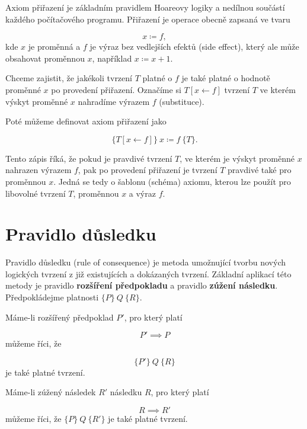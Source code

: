 Axiom přiřazení je základním pravidlem Hoareovy logiky a nedílnou součástí každého počítačového programu.
Přiřazení je operace obecně zapsaná ve tvaru

\begin{equation*}
    x \coloneqq f,
\end{equation*}
kde $x$ je proměnná a $f$ je výraz bez vedlejších efektů (side effect),
který ale může obsahovat proměnnou $x$, například $x \coloneqq x + 1$.

Chceme zajistit, že jakékoli tvrzení $T$ platné o $f$
je také platné o hodnotě proměnné $x$ po provedení přiřazení.
Označíme si $T[x \leftarrow f]$ tvrzení $T$ ve kterém výskyt proměnné $x$ nahradíme výrazem $f$ (substituce).

Poté můžeme definovat axiom přiřazení jako

\begin{equation*}
    \{ T[x \leftarrow f] \} \  x \coloneqq f \  \{ T \}.
\end{equation*}

Tento zápis říká, že pokud je pravdivé tvrzení $T$, ve kterém
je výskyt proměnné $x$ nahrazen výrazem $f$, pak po provedení přiřazení
je tvrzení $T$ pravdivé také pro proměnnou $x$.
Jedná se tedy o šablonu (schéma) axiomu,
kterou lze použít pro libovolné tvrzení $T$, proměnnou $x$ a výraz $f$.

\section{Pravidlo důsledku}
\label{sec:hoare-pravidlo-dusledku}

Pravidlo důsledku (rule of consequence) je metoda umožnující
tvorbu nových logických tvrzení z již existujících a dokázaných tvrzení.
Základní aplikací této metody je pravidlo \textbf{rozšíření předpokladu}
a pravidlo \textbf{zúžení následku}.
Předpokládejme platnosti $\{ P \} \  Q \  \{ R \}$.

Máme-li rozšířený předpoklad $P'$, pro který platí

\begin{equation*}
    P' \implies P
\end{equation*}
můžeme říci, že

\begin{equation*}
    \{ P' \} \  Q \  \{ R \}
\end{equation*}
je také platné tvrzení.

Máme-li zúžený následek $R'$ následku $R$, pro který platí

\begin{equation*}
    R \implies R'
\end{equation*}
můžeme říci, že $\{ P \} \  Q \  \{ R' \}$ je také platné tvrzení.

